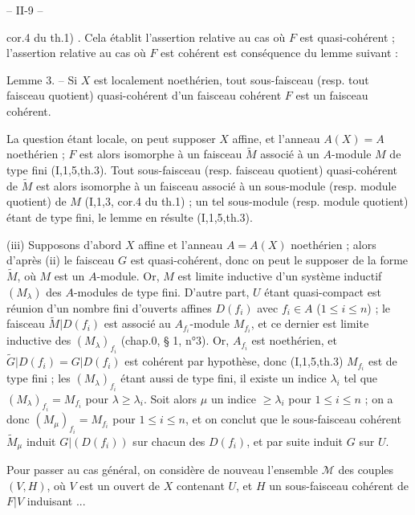 \newpage


-- II-9 --

cor.4 du th.1) . Cela établit l'assertion relative au cas où $F$ est quasi-cohérent ; l'assertion relative au cas où $F$ est cohérent est conséquence du lemme suivant :

Lemme 3. -- Si $X$ est localement noethérien, tout sous-faisceau (resp. tout faisceau quotient) quasi-cohérent d'un faisceau cohérent $F$ est un faisceau cohérent.

La question étant locale, on peut supposer $X$ affine, et l'anneau $A(X)=A$ noethérien ; $F$ est alors isomorphe à un faisceau $\widetilde{M}$ associé à un $A$-module $M$ de type fini (I,1,5,th.3). Tout sous-faisceau (resp. faisceau quotient) quasi-cohérent de $\widetilde{M}$ est alors isomorphe à un faisceau associé à un sous-module (resp. module quotient) de $M$ (I,1,3, cor.4 du th.1) ; un tel sous-module (resp. module quotient) étant de type fini, le lemme en résulte (I,1,5,th.3).

(iii) Supposons d'abord $X$ affine et l'anneau $A=A(X)$ noethérien ; alors d'après (ii) le faisceau $G$ est quasi-cohérent, donc on peut le supposer de la forme $\widetilde{M}$, où $M$ est un $A$-module. Or, $M$ est limite inductive d'un système inductif $(M_\lambda)$ des $A$-modules de type fini. D'autre part, $U$ étant quasi-compact est réunion d'un nombre fini d'ouverts affines $D(f_i)$ avec $f_i \in A$ ($1 \le i \le n$) ; le faisceau $\widetilde{M}|D(f_i)$ est associé au $A_{f_i}$-module $M_{f_i}$, et ce dernier est limite inductive des $(M_\lambda)_{f_i}$ (chap.0, § 1, n°3). Or, $A_{f_i}$ est noethérien, et $\widetilde{G}|D(f_i)=G|D(f_i)$ est cohérent par hypothèse, donc (I,1,5,th.3) $M_{f_i}$ est de type fini ; les $(M_\lambda)_{f_i}$ étant aussi de type fini, il existe un indice $\lambda_i$ tel que $(M_\lambda)_{f_i} = M_{f_i}$ pour $\lambda \ge \lambda_i$. Soit alors $\mu$ un indice $\ge \lambda_i$ pour $1 \le i \le n$ ; on a donc $(M_\mu)_{f_i} = M_{f_i}$ pour $1 \le i \le n$, et on conclut que le sous-faisceau cohérent $\widetilde{M}_\mu$ induit $G|(D(f_i))$ sur chacun des $D(f_i)$, et par suite induit $G$ sur $U$.

Pour passer au cas général, on considère de nouveau l'ensemble $\mathcal{M}$ des couples $(V,H)$, où $V$ est un ouvert de $X$ contenant $U$, et $H$ un sous-faisceau cohérent de $F|V$ induisant ...

\newpage


